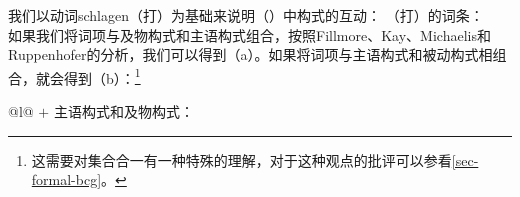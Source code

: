 我们以动词schlagen（打）为基础来说明（）中构式的互动：
\eas
{}（打）的词条：\\
\zs
如果我们将词项与及物构式和主语构式组合，按照Fillmore、Kay、Michaelis和Ruppenhofer的分析，我们可以得到（a）。如果将词项与主语构式和被动构式相组合，就会得到（b）：\footnote{%
	这需要对集合合一有一种特殊的理解，对于这种观点的批评可以参看\ref{sec-formal-bcg}。
}
\eal
\label{ex-schlagen-linking}
\ex 
\label{ex-schlagen-transitive}
\begin{tabular}[t]{@{}l@{}}
 $+$ 主语构式和及物构式：\\
\end{tabular}
